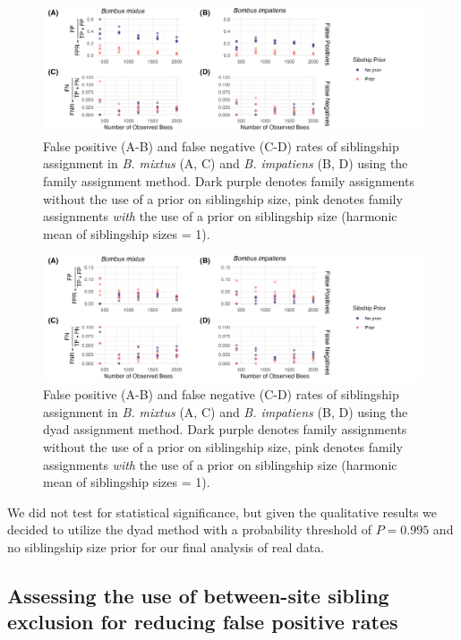 \documentclass[12pt]{article}
\begin{document}
\begin{figure}[H]
    \centering
    \includegraphics[width=\linewidth]{appendix_figures/sibprior_families.jpg}
    \caption{False positive (A-B) and false negative (C-D) rates of siblingship assignment in \emph{B. mixtus} (A, C) and \emph{B. impatiens} (B, D) using the family assignment method. Dark purple denotes family assignments without the use of a prior on siblingship size, pink denotes family assignments \emph{with} the use of a prior on siblingship size (harmonic mean of siblingship sizes = 1).}
    \label{fig:sibprior_families}
\end{figure}

\begin{figure}[H]
    \centering
    \includegraphics[width=\linewidth]{appendix_figures/sibprior_dyads.jpg}
    \caption{False positive (A-B) and false negative (C-D) rates of siblingship assignment in \emph{B. mixtus} (A, C) and \emph{B. impatiens} (B, D) using the dyad assignment method. Dark purple denotes family assignments without the use of a prior on siblingship size, pink denotes family assignments \emph{with} the use of a prior on siblingship size (harmonic mean of siblingship sizes = 1).}
    \label{fig:sibprior_dyads}
\end{figure}


We did not test for statistical significance, but given the qualitative results we decided to utilize the dyad method with a probability threshold of $P = 0.995$ and no siblingship size prior for our final analysis of real data. 


\subsection{Assessing the use of between-site sibling exclusion for reducing false positive rates}
\end{document}
